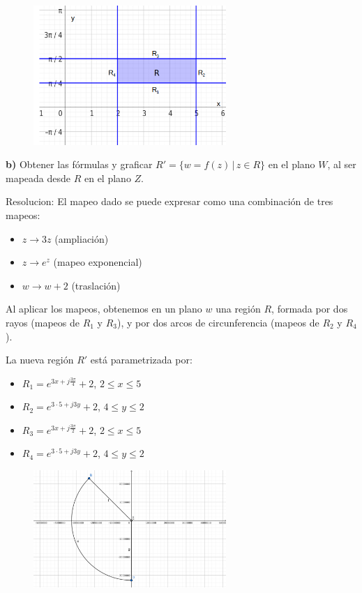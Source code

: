 \documentclass[12pt]{report}
\begin{document}
\begin{figure}[h] %
    \centering %
    \includegraphics[width=0.65\textwidth]{./Imagenes/foto1Ej4.png} %
\end{figure}

\textbf{b)} Obtener las fórmulas y graficar $R' = \{w = f(z) \, | \, z \in R\}$ en el plano $W$, al ser mapeada desde $R$ en el plano $Z$.

Resolucion:
El mapeo dado se puede expresar como una combinación de tres mapeos:

\begin{itemize}
    \item $z \rightarrow 3z$ (ampliación)
    \item $z \rightarrow e^z$ (mapeo exponencial)
    \item $w \rightarrow w + 2$ (traslación)
\end{itemize}

Al aplicar los mapeos, obtenemos en un plano $w$ una región $R$, formada por dos rayos (mapeos de $R_1$ y $R_3$), y por dos arcos de circunferencia (mapeos de $R_2$ y $R_4$).

La nueva región $R'$ está parametrizada por:
\begin{itemize}
    \item $R_1 = e^{3x+j\frac{3\pi}{4}} + 2$, $2 \leq x \leq 5$
    \item $R_2 = e^{3 \cdot 5+j3y} + 2$, $4 \leq y \leq 2$
    \item $R_3 = e^{3x+j\frac{3\pi}{2}} + 2$, $2 \leq x \leq 5$
    \item $R_4 = e^{3 \cdot 5+j3y} + 2$, $4 \leq y \leq 2$
\end{itemize}


\begin{figure}[h] %
    \centering %
    \includegraphics[width=0.65\textwidth]{./Imagenes/foto2Ej4.png} %
\end{figure}
\end{document}
